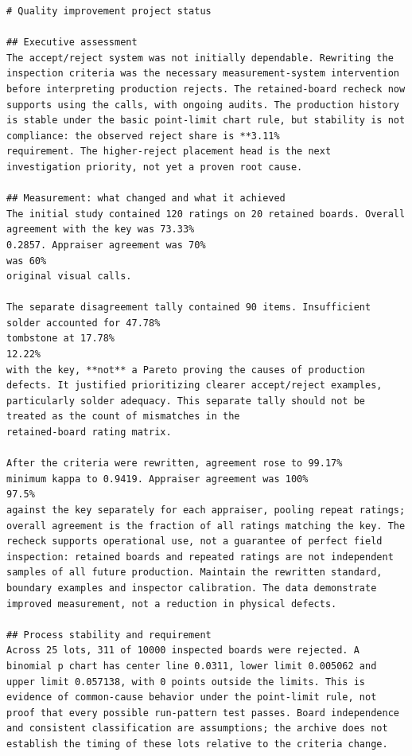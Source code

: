 \begin{lstlisting}[caption={GPT-6-astra on seed 2 under the plain instruction, the report in full.},label={lst:c33-s2-report}]
# Quality improvement project status

## Executive assessment
The accept/reject system was not initially dependable. Rewriting the
inspection criteria was the necessary measurement-system intervention
before interpreting production rejects. The retained-board recheck now
supports using the calls, with ongoing audits. The production history
is stable under the basic point-limit chart rule, but stability is not
compliance: the observed reject share is **3.11%
requirement. The higher-reject placement head is the next
investigation priority, not yet a proven root cause.

## Measurement: what changed and what it achieved
The initial study contained 120 ratings on 20 retained boards. Overall
agreement with the key was 73.33%
0.2857. Appraiser agreement was 70%
was 60%
original visual calls.

The separate disagreement tally contained 90 items. Insufficient
solder accounted for 47.78%
tombstone at 17.78%
12.22%
with the key, **not** a Pareto proving the causes of production
defects. It justified prioritizing clearer accept/reject examples,
particularly solder adequacy. This separate tally should not be
treated as the count of mismatches in the
retained-board rating matrix.

After the criteria were rewritten, agreement rose to 99.17%
minimum kappa to 0.9419. Appraiser agreement was 100%
97.5%
against the key separately for each appraiser, pooling repeat ratings;
overall agreement is the fraction of all ratings matching the key. The
recheck supports operational use, not a guarantee of perfect field
inspection: retained boards and repeated ratings are not independent
samples of all future production. Maintain the rewritten standard,
boundary examples and inspector calibration. The data demonstrate
improved measurement, not a reduction in physical defects.

## Process stability and requirement
Across 25 lots, 311 of 10000 inspected boards were rejected. A
binomial p chart has center line 0.0311, lower limit 0.005062 and
upper limit 0.057138, with 0 points outside the limits. This is
evidence of common-cause behavior under the point-limit rule, not
proof that every possible run-pattern test passes. Board independence
and consistent classification are assumptions; the archive does not
establish the timing of these lots relative to the criteria change.


\end{lstlisting}
